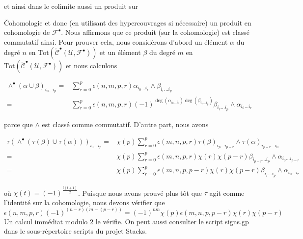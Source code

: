 et ainsi dans le colimite aussi un produit sur {\v Cohomologie et donc (en utilisant des hypercouvrages si nécessaire) un produit en cohomologie de ${\mathcal F}^\bullet$. Nous affirmons que ce produit (sur la cohomologie) est classé commutatif ainsi. Pour prouver cela, nous considérons d'abord un élément $\alpha$ du degré $n$ en
$\text{Tot}(\check{\mathcal{C}}^\bullet({\mathcal U}, {\mathcal F}^\bullet))$
et un élément $\beta$ du degré $m$ en
$\text{Tot}(\check{\mathcal{C}}^\bullet({\mathcal U}, {\mathcal F}^\bullet))$
et nous calculons

\begin{align*}
\wedge^\bullet(\alpha \cup \beta)_{i_0 \ldots i_p}
= &
\sum\nolimits_{r = 0}^p
\epsilon(n, m, p, r)
\alpha_{i_0 \ldots i_r} \wedge \beta_{i_r \ldots i_p} \\
= &
\sum\nolimits_{r = 0}^p
\epsilon(n, m, p, r)
(-1)^{\deg(\alpha_{i_0 \ldots i_r})\deg(\beta_{i_r \ldots i_p})}
\beta_{i_r \ldots i_p} \wedge \alpha_{i_0 \ldots i_r}
\end{align*}

parce que $\wedge$ est classé comme commutatif. D'autre part, nous avons

\begin{align*}
\tau(\wedge^\bullet(\tau(\beta) \cup \tau(\alpha)))_{i_0 \ldots i_p}
= &
\chi(p)
\sum\nolimits_{r = 0}^p
\epsilon(m, n, p, r)
\tau(\beta)_{i_p \ldots i_{p - r}} \wedge \tau(\alpha)_{i_{p - r} \ldots i_0}
\\
= &
\chi(p)
\sum\nolimits_{r = 0}^p
\epsilon(m, n, p, r) \chi(r) \chi(p - r)
\beta_{i_{p - r} \ldots i_p} \wedge \alpha_{i_0 \ldots i_{p - r}}
\\
= &
\chi(p)
\sum\nolimits_{r = 0}^p
\epsilon(m, n, p, p - r) \chi(r) \chi(p - r)
\beta_{i_r \ldots i_p} \wedge \alpha_{i_0 \ldots i_r}
\end{align*}

où $\chi(t) = (-1)^{\frac{t(t + 1)}{2}}$. Puisque nous avons prouvé plus tôt que
$\tau$ agit comme l'identité sur la cohomologie, nous devons vérifier que
$$
\epsilon(n, m, p, r)
(-1)^{(n - r)(m - (p - r))}
=
(-1)^{nm} \chi(p)\epsilon(m, n, p, p - r) \chi(r) \chi(p - r)
$$
Un calcul immédiat modulo $2$ le vérifie. On peut aussi consulter le script signs.gp dans le sous-répertoire scripts du projet Stacks.

}
